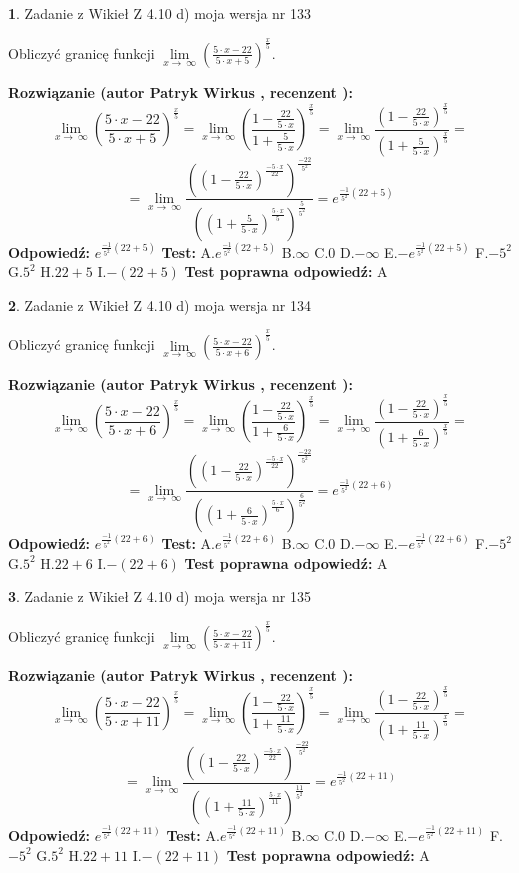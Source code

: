 \documentclass[12pt, a4paper]{article}
\theoremstyle{definition} %
\newtheorem{zad}{}
\newcommand{\zadStart}[1]{\begin{zad}#1\newline}
\newcommand{\zadStop}{\end{zad}}
\newcommand{\rozwStart}[2]{\noindent \textbf{Rozwiązanie (autor #1 , recenzent #2): }\newline}
\newcommand{\rozwStop}{\newline}
\newcommand{\odpStart}{\noindent \textbf{Odpowiedź:}\newline}
\newcommand{\odpStop}{\newline}
\newcommand{\testStart}{\noindent \textbf{Test:}\newline}
\newcommand{\testStop}{\newline}
\newcommand{\kluczStart}{\noindent \textbf{Test poprawna odpowiedź:}\newline}
\newcommand{\kluczStop}{\newline}
\begin{document}
\zadStart{Zadanie z Wikieł Z 4.10 d) moja wersja nr 133}


Obliczyć granicę funkcji  $\lim\limits_{x\to\ \infty}(\frac{5\cdot x-22}{5\cdot x+5})^{\frac{x}{5}}$.
\zadStop
\rozwStart{Patryk Wirkus}{}
$$\lim\limits_{x\to\ \infty}(\frac{5\cdot x-22}{5\cdot x+5})^{\frac{x}{5}} = \lim\limits_{x\to\ \infty}(\frac{1-\frac{22}{5\cdot x}}{1+\frac{5}{5\cdot x}})^{\frac{x}{5}}=\lim\limits_{x\to\ \infty}\frac{(1-\frac{22}{5\cdot x})^{\frac{x}{5}}}{(1+\frac{5}{5\cdot x})^{\frac{x}{5}}}=$$
$$=\lim\limits_{x\to\ \infty}\frac{((1-\frac{22}{5\cdot x})^{\frac{-5\cdot x}{22}})^{\frac{-22}{5^{2}}}}{((1+\frac{5}{5\cdot x})^{\frac{5\cdot x}{5}})^{\frac{5}{5^{2}}}}=e^{\frac{-1}{5^{2}}(22+5)}$$
\rozwStop
\odpStart
$e^{\frac{-1}{5^{2}}(22+5)}$
\odpStop
\testStart
A.$e^{\frac{-1}{5^{2}}(22+5)}$ B.$\infty$ C.$0$ D.$-\infty$ E.$-e^{\frac{-1}{5^{2}}(22+5)}$
F.$-5^{2}$ G.$5^{2}$
H.$22+5$
I.$-(22+5)$
\testStop
\kluczStart
A
\kluczStop



\zadStart{Zadanie z Wikieł Z 4.10 d) moja wersja nr 134}


Obliczyć granicę funkcji  $\lim\limits_{x\to\ \infty}(\frac{5\cdot x-22}{5\cdot x+6})^{\frac{x}{5}}$.
\zadStop
\rozwStart{Patryk Wirkus}{}
$$\lim\limits_{x\to\ \infty}(\frac{5\cdot x-22}{5\cdot x+6})^{\frac{x}{5}} = \lim\limits_{x\to\ \infty}(\frac{1-\frac{22}{5\cdot x}}{1+\frac{6}{5\cdot x}})^{\frac{x}{5}}=\lim\limits_{x\to\ \infty}\frac{(1-\frac{22}{5\cdot x})^{\frac{x}{5}}}{(1+\frac{6}{5\cdot x})^{\frac{x}{5}}}=$$
$$=\lim\limits_{x\to\ \infty}\frac{((1-\frac{22}{5\cdot x})^{\frac{-5\cdot x}{22}})^{\frac{-22}{5^{2}}}}{((1+\frac{6}{5\cdot x})^{\frac{5\cdot x}{6}})^{\frac{6}{5^{2}}}}=e^{\frac{-1}{5^{2}}(22+6)}$$
\rozwStop
\odpStart
$e^{\frac{-1}{5^{2}}(22+6)}$
\odpStop
\testStart
A.$e^{\frac{-1}{5^{2}}(22+6)}$ B.$\infty$ C.$0$ D.$-\infty$ E.$-e^{\frac{-1}{5^{2}}(22+6)}$
F.$-5^{2}$ G.$5^{2}$
H.$22+6$
I.$-(22+6)$
\testStop
\kluczStart
A
\kluczStop



\zadStart{Zadanie z Wikieł Z 4.10 d) moja wersja nr 135}


Obliczyć granicę funkcji  $\lim\limits_{x\to\ \infty}(\frac{5\cdot x-22}{5\cdot x+11})^{\frac{x}{5}}$.
\zadStop
\rozwStart{Patryk Wirkus}{}
$$\lim\limits_{x\to\ \infty}(\frac{5\cdot x-22}{5\cdot x+11})^{\frac{x}{5}} = \lim\limits_{x\to\ \infty}(\frac{1-\frac{22}{5\cdot x}}{1+\frac{11}{5\cdot x}})^{\frac{x}{5}}=\lim\limits_{x\to\ \infty}\frac{(1-\frac{22}{5\cdot x})^{\frac{x}{5}}}{(1+\frac{11}{5\cdot x})^{\frac{x}{5}}}=$$
$$=\lim\limits_{x\to\ \infty}\frac{((1-\frac{22}{5\cdot x})^{\frac{-5\cdot x}{22}})^{\frac{-22}{5^{2}}}}{((1+\frac{11}{5\cdot x})^{\frac{5\cdot x}{11}})^{\frac{11}{5^{2}}}}=e^{\frac{-1}{5^{2}}(22+11)}$$
\rozwStop
\odpStart
$e^{\frac{-1}{5^{2}}(22+11)}$
\odpStop
\testStart
A.$e^{\frac{-1}{5^{2}}(22+11)}$ B.$\infty$ C.$0$ D.$-\infty$ E.$-e^{\frac{-1}{5^{2}}(22+11)}$
F.$-5^{2}$ G.$5^{2}$
H.$22+11$
I.$-(22+11)$
\testStop
\kluczStart
A
\kluczStop
\end{document}
